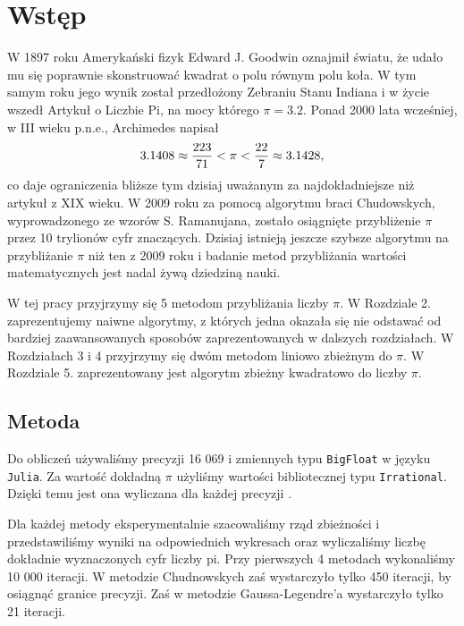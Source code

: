 \documentclass[11pt, wide, leqno]{mwart}
\begin{document}
\maketitle
\tableofcontents

\section{Wstęp}\label{sec:ws}

W 1897 roku Amerykański fizyk Edward J. Goodwin oznajmił światu, że udało mu się poprawnie skonstruować kwadrat o polu równym polu koła. W tym samym roku jego wynik został przedłożony Zebraniu Stanu Indiana i w życie wszedł Artykuł o Liczbie Pi, na mocy którego $\pi=3.2$. Ponad 2000 lata wcześniej, w III wieku p.n.e., Archimedes napisał
$$3.1408\approx{223\over71}<\pi<{22\over7}\approx 3.1428,$$
co daje ograniczenia bliższe tym dzisiaj uważanym za najdokładniejsze niż artykuł z XIX wieku. W 2009 roku za pomocą algorytmu braci Chudowskych, wyprowadzonego ze wzorów S. Ramanujana, zostało osiągnięte przybliżenie $\pi$ przez 10 trylionów cyfr znaczących. Dzisiaj istnieją jeszcze szybsze algorytmu na przybliżanie $\pi$ niż ten z 2009 roku i badanie metod przybliżania wartości matematycznych jest nadal żywą dziedziną nauki.

W tej pracy przyjrzymy się 5 metodom przybliżania liczby $\pi$. W Rozdziale 2. zaprezentujemy naiwne algorytmy, z których jedna okazała się nie odstawać od bardziej zaawansowanych sposobów zaprezentowanych w dalszych rozdziałach. W Rozdziałach 3 i 4 przyjrzymy się dwóm metodom liniowo zbieżnym do $\pi$. W Rozdziale 5. zaprezentowany jest algorytm zbieżny kwadratowo do liczby $\pi$.

\subsection{Metoda}

Do obliczeń używaliśmy precyzji 16 069 i zmiennych typu \verb+BigFloat+ w języku \verb+Julia+. Za wartość dokładną $\pi$ użyliśmy wartości bibliotecznej typu \verb+Irrational+. Dzięki temu jest ona wyliczana dla każdej precyzji \cite{julia}.

Dla każdej metody eksperymentalnie szacowaliśmy rząd zbieżności i przedstawiliśmy wyniki na odpowiednich wykresach oraz wyliczaliśmy liczbę dokładnie wyznaczonych cyfr liczby pi. Przy pierwszych 4 metodach wykonaliśmy 10 000 iteracji. W metodzie Chudnowskych zaś wystarczyło tylko 450 iteracji, by osiągnąć granice precyzji. Zaś w metodzie Gaussa-Legendre'a wystarczyło tylko 21 iteracji. 
\end{document}
